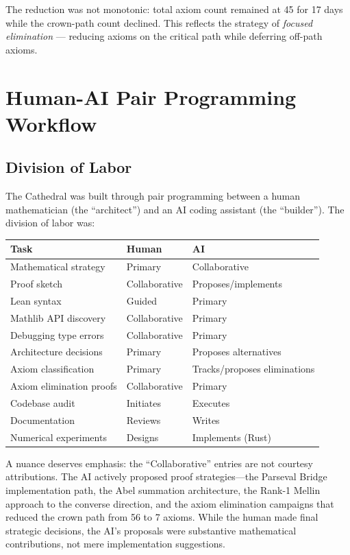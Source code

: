 \documentclass[11pt,a4paper]{article}
\theoremstyle{definition}
\begin{document}
The reduction was not monotonic: total axiom count remained at 45
for 17 days while the crown-path count declined. This reflects the
strategy of \emph{focused elimination} --- reducing axioms on the
critical path while deferring off-path axioms.

\section{Human-AI Pair Programming Workflow}
\label{sec:workflow}

\subsection{Division of Labor}

The Cathedral was built through pair programming between a human
mathematician (the ``architect'') and an AI coding assistant (the
``builder''). The division of labor was:

\begin{center}
\begin{tabular}{@{}lll@{}}
\toprule
\textbf{Task} & \textbf{Human} & \textbf{AI} \\
\midrule
Mathematical strategy & Primary & Collaborative \\
Proof sketch & Collaborative & Proposes/implements \\
Lean syntax & Guided & Primary \\
Mathlib API discovery & Collaborative & Primary \\
Debugging type errors & Collaborative & Primary \\
Architecture decisions & Primary & Proposes alternatives \\
Axiom classification & Primary & Tracks/proposes eliminations \\
Axiom elimination proofs & Collaborative & Primary \\
Codebase audit & Initiates & Executes \\
Documentation & Reviews & Writes \\
Numerical experiments & Designs & Implements (Rust) \\
\bottomrule
\end{tabular}
\end{center}

A nuance deserves emphasis: the ``Collaborative'' entries are not
courtesy attributions. The AI actively proposed proof strategies---the
Parseval Bridge implementation path, the Abel summation architecture,
the Rank-1 Mellin approach to the converse direction, and the axiom
elimination campaigns that reduced the crown path from 56 to 7 axioms.
While the human made final strategic decisions, the AI's proposals
were substantive mathematical contributions, not mere implementation
suggestions.
\end{document}
